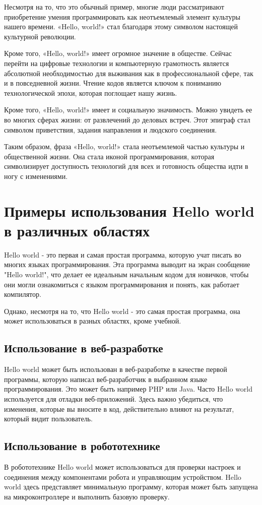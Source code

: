 \documentclass[draft]{article}
\begin{document}
Несмотря на то, что это обычный пример, многие люди рассматривают приобретение умения программировать как неотъемлемый элемент культуры нашего времени. «Hello, world!» стал благодаря этому символом настоящей культурной революции.

Кроме того, «Hello, world!» имеет огромное значение в обществе. Сейчас перейти на цифровые технологии и компьютерную грамотность является абсолютной необходимостью для выживания как в профессиональной сфере, так и в повседневной жизни. Чтение кодов является ключом к пониманию технологической эпохи, которая поглощает нашу жизнь.

Кроме того, «Hello, world!» имеет и социальную значимость. Можно увидеть ее во многих сферах жизни: от развлечений до деловых встреч. Этот эпиграф стал символом приветствия, задания направления и людского соединения.

Таким образом, фраза «Hello, world!» стала неотъемлемой частью культуры и общественной жизни. Она стала иконой программирования, которая символизирует доступность технологий для всех и готовность общества идти в ногу с изменениями.\newpage\section{Примеры использования Hello world в различных областях}

Hello world - это первая и самая простая программа, которую учат писать во многих языках программирования. Эта программа выводит на экран сообщение "Hello world!", что делает ее идеальным начальным кодом для новичков, чтобы они могли ознакомиться с языком программирования и понять, как работает компилятор.

Однако, несмотря на то, что Hello world - это самая простая программа, она может использоваться в разных областях, кроме учебной.

\subsection{Использование в веб-разработке}
Hello world может быть использован в веб-разработке в качестве первой программы, которую написал веб-разработчик в выбранном языке программирования. Это может быть например PHP или Java. Часто Hello world используется для отладки веб-приложений. Здесь важно убедиться, что изменения, которые вы вносите в код, действительно влияют на результат, который видит пользователь.

\subsection{Использование в робототехнике}
В робототехнике Hello world может использоваться для проверки настроек и соединения между компонентами робота и управляющим устройством. Hello world здесь представляет минимальную программу, которая может быть запущена на микроконтроллере и выполнить базовую проверку.
\end{document}
